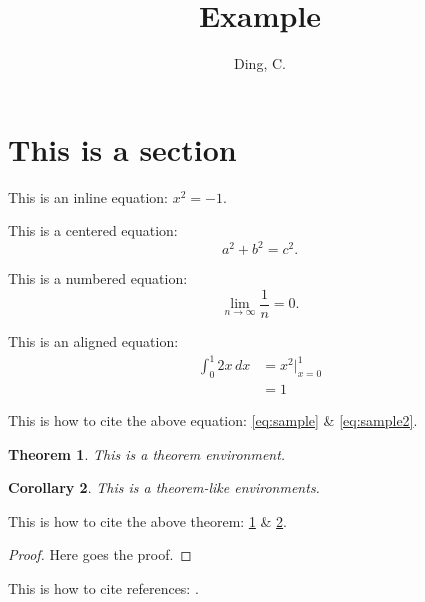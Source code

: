 \documentclass{article}
\title{Example}
\author{Ding, C.}
\date{}
\newtheorem{theorem}{Theorem}
\newtheorem{corollary}[theorem]{Corollary}
\begin{document}
\section{This is a section}

This is an inline equation: $x^2=-1$.

This is a centered equation: $$a^2+b^2=c^2.$$

This is a numbered equation: 
$$\begin{equation}
\lim_{n\to\infty}\frac{1}{n}=0.
\label{eq:sample}
\end{equation}$$

This is an aligned equation:
$$\begin{align}
	\int_{0}^{1}2x\,dx 
	&=x^2\Big|_{x=0}^1\label{eq:sample2}\\
	&=1
\end{align}$$

	
This is how to cite the above equation: \eqref{eq:sample} \& \eqref{eq:sample2}.

\begin{theorem} \label{thm:sample}
	This is a theorem environment.
\end{theorem}

\begin{corollary}\label{corollary}
	This is a theorem-like environments.
\end{corollary}

This is how to cite the above theorem: \ref{thm:sample} \& \ref{corollary}.

\begin{proof}
	Here goes the proof.
\end{proof}

This is how to cite references: \cite{mac2013categories}.





\end{document}

